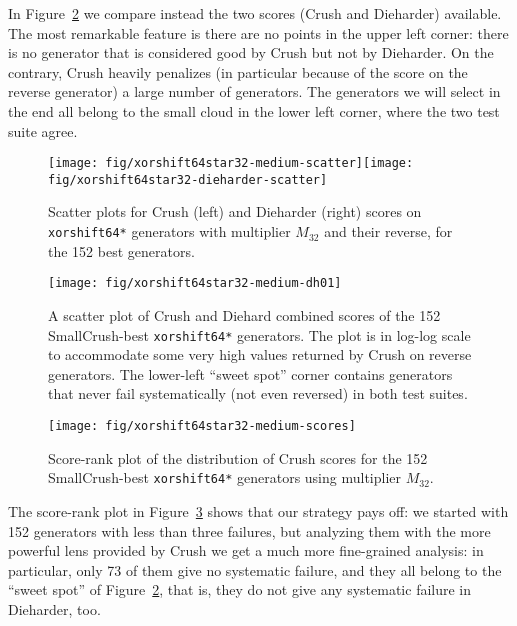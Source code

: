 \documentclass{acmsmalltr}
\newcommand{\xorshifts}[1][]{\texttt{xorshift#1*}\xspace}
\begin{document}
In Figure~\ref{fig:xorshiftlcgdh01} we compare instead the two scores (Crush and
Dieharder) available. The most remarkable feature is there are no points in the upper left corner:
there is no generator that is considered good by Crush but not by Dieharder. On
the contrary, Crush heavily penalizes (in particular because of the score on the
reverse generator) a large number of generators. The generators we will select
in the end all belong to the small cloud in the lower left corner, where the two
test suite agree.

\begin{figure}
\centering
\texttt{[image: fig/xorshift64star32-medium-scatter]}\quad\texttt{[image: fig/xorshift64star32-dieharder-scatter]}
\caption{\label{fig:xorshiftlcgdh01scatter}Scatter plots for Crush (left)
and Dieharder (right) scores on \xorshifts[64] generators with multiplier $M_{32}$ and their reverse, for the 152 best
generators.}
\end{figure}

\begin{figure}
\centering
\texttt{[image: fig/xorshift64star32-medium-dh01]}
\caption{\label{fig:xorshiftlcgdh01}A scatter plot of Crush and Diehard
combined scores of the 152 SmallCrush-best \xorshifts[64] generators. The plot is in log-log scale
to accommodate some very high values returned by Crush on reverse
generators. The lower-left ``sweet spot'' corner contains generators
that never fail systematically (not even reversed) in both test suites.}
\end{figure}


\begin{figure}
\centering
\texttt{[image: fig/xorshift64star32-medium-scores]}
\caption{\label{fig:xorshiftlcgmediumscores}
Score-rank plot of the distribution of Crush scores for the 
152 SmallCrush-best \xorshifts[64] generators using multiplier $M_{32}$.}
\end{figure}



The score-rank plot in Figure~\ref{fig:xorshiftlcgmediumscores} shows that our strategy
pays off: we started with 152 generators with less than three failures, but
analyzing them with the more powerful lens provided by Crush we get a much
more fine-grained analysis: in particular, only 73 of them give no systematic
failure, and they all belong to the ``sweet spot'' of
Figure~\ref{fig:xorshiftlcgdh01}, that is, they do not give any systematic
failure in Dieharder, too.
\end{document}
